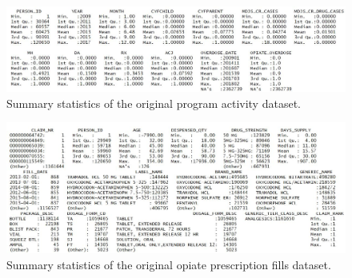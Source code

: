 \documentclass[twoside,10.5pt]{article}
\begin{document}
\begin{figure}
\begin{center}
\includegraphics[width=6in]{original_prog_summary.JPG}
\end{center}
\caption{Summary statistics of the original program activity dataset.}
\label{fig:orig_prog}
\end{figure}

\begin{figure}
\begin{center}
\includegraphics[width=6in]{original_presc_summary.JPG}
\end{center}
\caption{Summary statistics of the original opiate prescription fills dataset.}
\label{fig:orig_presc}
\end{figure}

\newpage
\theendnotes


\end{document}
